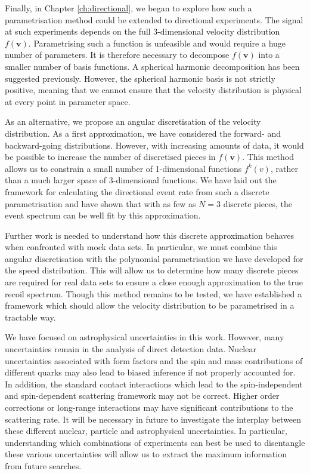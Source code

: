 Finally, in Chapter \ref{ch:directional}, we began to explore how such a parametrisation method could be extended to directional experiments. The signal at such experiments depends on the full 3-dimensional velocity distribution $f(\textbf{v})$. Parametrising such a function is unfeasible and would require a huge number of parameters. It is therefore necessary to decompose $f(\textbf{v})$ into a smaller number of basis functions. A spherical harmonic decomposition has been suggested previously. However, the spherical harmonic basis is not strictly positive, meaning that we cannot ensure that the velocity distribution is physical at every point in parameter space.

As an alternative, we propose an angular discretisation of the velocity distribution. As a first approximation, we have considered the forward- and backward-going distributions. However, with increasing amounts of data, it would be possible to increase the number of discretised pieces in $f(\textbf{v})$. This method allows us to constrain a small number of 1-dimensional functions $f^k(v)$, rather than a much larger space of 3-dimensional functions. We have laid out the framework for calculating the directional event rate from such a discrete parametrisation and have shown that with as few as $N=3$ discrete pieces, the event spectrum can be well fit by this approximation.

Further work is needed to understand how this discrete approximation behaves when confronted with mock data sets. In particular, we must combine this angular discretisation with the polynomial parametrisation we have developed for the speed distribution. This will allow us to determine how many discrete pieces are required for real data sets to ensure a close enough approximation to the true recoil spectrum. Though this method remains to be tested, we have established a framework which should allow the velocity distribution to be parametrised in a tractable way.

We have focused on astrophysical uncertainties in this work. However, many uncertainties remain in the analysis of direct detection data. Nuclear uncertainties associated with form factors and the spin and mass contributions of different quarks may also lead to biased inference if not properly accounted for. In addition, the standard contact interactions which lead to the spin-independent and spin-dependent scattering framework may not be correct. Higher order corrections or long-range interactions may have significant contributions to the scattering rate. It will be necessary in future to investigate the interplay between these different nuclear, particle and astrophysical uncertainties. In particular, understanding which combinations of experiments can best be used to disentangle these various uncertainties will allow us to extract the maximum information from future searches.


